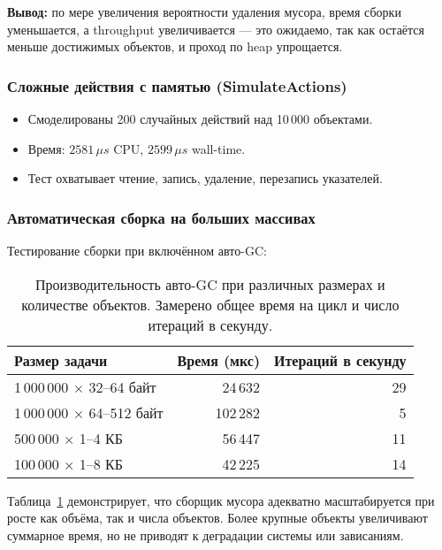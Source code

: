\textbf{Вывод:} по мере увеличения вероятности удаления мусора, время сборки уменьшается, а throughput увеличивается — это ожидаемо, так как остаётся меньше достижимых объектов, и проход по heap упрощается.

\subsubsection*{Сложные действия с памятью (SimulateActions)}

\begin{itemize}
    \item Смоделированы 200 случайных действий над 10\,000 объектами.
    \item Время: $2581\,\mu s$ CPU, $2599\,\mu s$ wall-time.
    \item Тест охватывает чтение, запись, удаление, перезапись указателей.
\end{itemize}

\subsubsection*{Автоматическая сборка на больших массивах}

Тестирование сборки при включённом авто-GC:

\begin{table}[ht]
    \caption{Производительность авто-GC при различных размерах и количестве объектов. Замерено общее время на цикл и число итераций в секунду.}
    \label{table:auto_gc}
    \footnotesize
    \centering
    \begin{tabular}{lrr}
        \toprule
        \textbf{Размер задачи} & \textbf{Время (мкс)} & \textbf{Итераций в секунду} \\
        \midrule
        1\,000\,000 × 32–64 байт   & 24\,632 & 29 \\
        1\,000\,000 × 64–512 байт  & 102\,282 & 5 \\
        500\,000 × 1–4 КБ          & 56\,447 & 11 \\
        100\,000 × 1–8 КБ          & 42\,225 & 14 \\
        \bottomrule
    \end{tabular}
\end{table}

\noindent
Таблица~\ref{table:auto_gc} демонстрирует, что сборщик мусора адекватно масштабируется при росте как объёма, так и числа объектов. Более крупные объекты увеличивают суммарное время, но не приводят к деградации системы или зависаниям.


